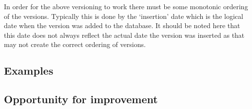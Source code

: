In order for the above versioning to work there must be some monotonic ordering of the versions. Typically this is done by the `insertion' date which is the logical date when the version was added to the database. It should be noted here that this date does not always reflect the actual date the version was inserted as that may not create the correct ordering of versions.


\subsection{Examples}
\subsection{Opportunity for improvement}
